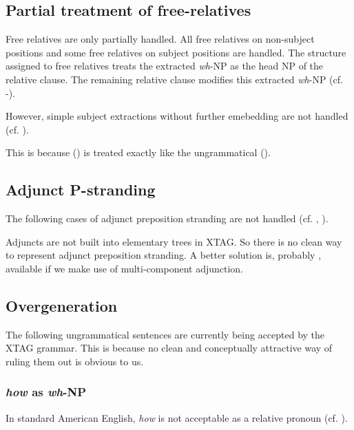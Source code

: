 \subsection{Partial treatment of free-relatives}
Free relatives are only partially handled. All free relatives on non-subject
positions and some free relatives on subject positions 
are handled. The structure assigned 
to free relatives treats the extracted {\em wh}-NP as the head NP of
the relative clause. The remaining relative clause modifies this
extracted {\em wh}-NP (cf. -).


However, simple subject extractions without further emebedding are not
handled (cf. ).

This is because () is treated exactly like the ungrammatical ().


\subsection{Adjunct P-stranding}
The following cases of adjunct preposition stranding are not handled 
(cf. , ).


Adjuncts are not built into elementary trees in XTAG. So there is no
clean way to represent adjunct preposition stranding. A better
solution is, probably , available if we make use of multi-component
adjunction. 

\subsection{Overgeneration}
The following ungrammatical sentences are currently being 
accepted by the XTAG grammar. This is because no clean 
and conceptually attractive way of ruling them out
is obvious to us.

\subsubsection{{\em how} as {\em wh}-NP}
In standard American English, {\em how} is not acceptable as a 
relative pronoun (cf. ).

